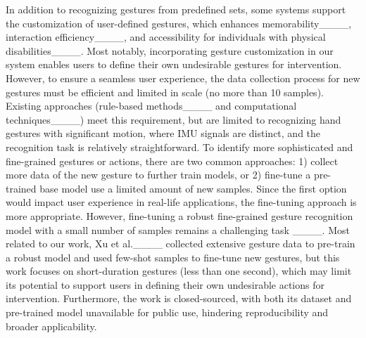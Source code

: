 In addition to recognizing gestures from predefined sets, some systems support the customization of user-defined gestures, which enhances memorability____, interaction efficiency____, and accessibility for individuals with physical disabilities____. Most notably, incorporating gesture customization in our system enables users to define their own undesirable gestures for intervention.  
However, to ensure a seamless user experience, the data collection process for new gestures must be efficient and limited in scale (\eg no more than 10 samples). Existing approaches (\eg rule-based methods____ and computational techniques____) meet this requirement, but are limited to recognizing hand gestures with significant motion, where IMU signals are distinct, and the recognition task is relatively straightforward. 
To identify more sophisticated and fine-grained gestures or actions, there are two common approaches: 1) collect more data of the new gesture to further train models, or 2) fine-tune a pre-trained base model use a limited amount of new samples. Since the first option would impact user experience in real-life applications, the fine-tuning approach is more appropriate. However, fine-tuning a robust fine-grained gesture recognition model with a small number of samples remains a challenging task ____. Most related to our work, Xu et al.____ collected extensive gesture data to pre-train a robust model and used few-shot samples to fine-tune new gestures, but this work focuses on short-duration gestures (less than one second), which may limit its potential to support users in defining their own undesirable actions for intervention. Furthermore, the work is closed-sourced, with both its dataset and pre-trained model unavailable for public use, hindering reproducibility and broader applicability.



